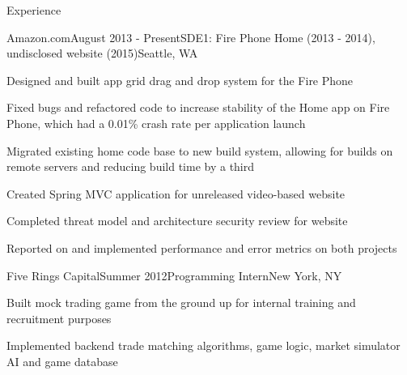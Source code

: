 \documentclass{resume} %
\begin{document}



\begin{rSection}{Experience}

\begin{rSubsection}{Amazon.com}{August 2013 - Present}{SDE1: Fire Phone Home (2013 - 2014), undisclosed website (2015)}{Seattle, WA}
\item Designed and built app grid drag and drop system for the Fire Phone
\item Fixed bugs and refactored code to increase stability of the Home app on Fire Phone, which had a 0.01\% crash rate per application launch
\item Migrated existing home code base to new build system, allowing for builds on remote servers and reducing build time by a third
\item Created Spring MVC application for unreleased video-based website
\item Completed threat model and architecture security review for website
\item Reported on and implemented performance and error metrics on both projects
\end{rSubsection}


\begin{rSubsection}{Five Rings Capital}{Summer 2012}{Programming Intern}{New York, NY}
\item Built mock trading game from the ground up for internal training and recruitment purposes
\item Implemented backend trade matching algorithms, game logic, market simulator AI and game database
\end{rSubsection}


\end{rSection}
\end{document}
